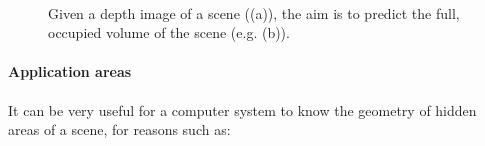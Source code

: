 \documentclass[10pt,twocolumn,letterpaper]{article}
\begin{document}
\begin{figure}
  \centering 
      \hfill
   \\
  \caption{Given a depth image of a scene (\eg (a)), the aim is to predict the full, occupied volume of the scene (e.g. (b)).}
\end{figure}


\paragraph{Application areas}
It can be very useful for a computer system to know the geometry of hidden areas of a scene, for reasons such as:
\end{document}
